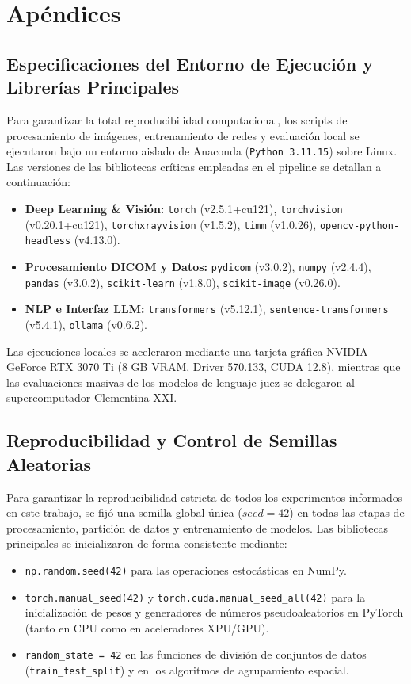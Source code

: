\documentclass[../main.tex]{subfiles}
\begin{document}
\cleardoublepage
\chapter*{Apéndices}

\section*{Especificaciones del Entorno de Ejecución y Librerías Principales}
Para garantizar la total reproducibilidad computacional, los scripts de procesamiento de imágenes, entrenamiento de redes y evaluación local se ejecutaron bajo un entorno aislado de Anaconda (\texttt{Python 3.11.15}) sobre Linux. Las versiones de las bibliotecas críticas empleadas en el pipeline se detallan a continuación:
\begin{itemize}
    \item \textbf{Deep Learning \& Visión:} \texttt{torch} (v2.5.1+cu121), \texttt{torchvision} (v0.20.1+cu121), \texttt{torchxrayvision} (v1.5.2), \texttt{timm} (v1.0.26), \texttt{opencv-python-headless} (v4.13.0).
    \item \textbf{Procesamiento DICOM y Datos:} \texttt{pydicom} (v3.0.2), \texttt{numpy} (v2.4.4), \texttt{pandas} (v3.0.2), \texttt{scikit-learn} (v1.8.0), \texttt{scikit-image} (v0.26.0).
    \item \textbf{NLP e Interfaz LLM:} \texttt{transformers} (v5.12.1), \texttt{sentence-transformers} (v5.4.1), \texttt{ollama} (v0.6.2).
\end{itemize}
Las ejecuciones locales se aceleraron mediante una tarjeta gráfica NVIDIA GeForce RTX 3070 Ti (8 GB VRAM, Driver 570.133, CUDA 12.8), mientras que las evaluaciones masivas de los modelos de lenguaje juez se delegaron al supercomputador Clementina XXI.

\section*{Reproducibilidad y Control de Semillas Aleatorias}
Para garantizar la reproducibilidad estricta de todos los experimentos informados en este trabajo, se fijó una semilla global única ($seed = 42$) en todas las etapas de procesamiento, partición de datos y entrenamiento de modelos. Las bibliotecas principales se inicializaron de forma consistente mediante:
\begin{itemize}
    \item \texttt{np.random.seed(42)} para las operaciones estocásticas en NumPy.
    \item \texttt{torch.manual\_seed(42)} y \texttt{torch.cuda.manual\_seed\_all(42)} para la inicialización de pesos y generadores de números pseudoaleatorios en PyTorch (tanto en CPU como en aceleradores XPU/GPU).
    \item \texttt{random\_state = 42} en las funciones de división de conjuntos de datos (\texttt{train\_test\_split}) y en los algoritmos de agrupamiento espacial.
\end{itemize}
\end{document}
